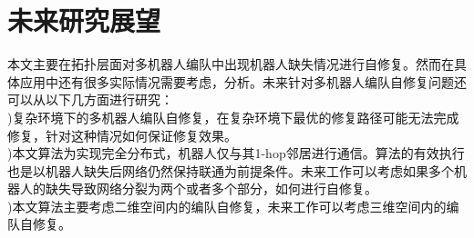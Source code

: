 \section{未来研究展望}
本文主要在拓扑层面对多机器人编队中出现机器人缺失情况进行自修复。然而在具体应用中还有很多实际情况需要考虑，分析。未来针对多机器人编队自修复问题还可以从以下几方面进行研究：\\
)复杂环境下的多机器人编队自修复，在复杂环境下最优的修复路径可能无法完成修复，针对这种情况如何保证修复效果。\\
)本文算法为实现完全分布式，机器人仅与其1-hop邻居进行通信。算法的有效执行也是以机器人缺失后网络仍然保持联通为前提条件。未来工作可以考虑如果多个机器人的缺失导致网络分裂为两个或者多个部分，如何进行自修复。\\
)本文算法主要考虑二维空间内的编队自修复，未来工作可以考虑三维空间内的编队自修复。
